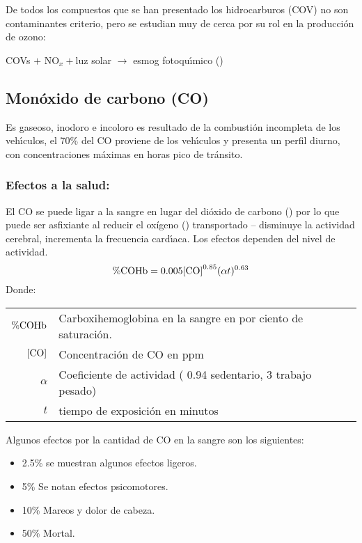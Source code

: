 De todos los compuestos que se han presentado los hidrocarburos (COV) no son contaminantes criterio, pero se estudian muy de cerca por su rol en la producción de ozono:

\begin{center}
COVs $+$ NO$_x +$luz solar $\longrightarrow$ esmog fotoqu\'{\i}mico () 
\end{center}

\subsection{Mon\'oxido de carbono (CO)}
Es gaseoso, inodoro e incoloro es resultado de la combusti\'on incompleta de los veh\'{\i}culos, el 70\% del CO proviene de los veh\'{\i}culos y presenta un perfil diurno, con concentraciones m\'aximas en horas pico de tr\'ansito.

\subsubsection{Efectos a la salud:}
El CO se puede ligar a la sangre en lugar del dióxido de carbono () por lo que puede ser asfixiante al reducir el oxígeno () transportado -- disminuye la actividad cerebral, incrementa la frecuencia card\'{\i}aca. Los efectos dependen del nivel de actividad.
\begin{equation}
\%\ce{COHb}  = 0.005[\ce{CO]}^{0.85}(\alpha t)^{0.63}
\end{equation}
Donde:

\begin{tabular}{r @{---}l}
$\%\ce{COHb} $ & Carboxihemoglobina en la sangre en por ciento de sa\-tu\-ra\-ci\'on.\\
$[\ce{CO}]$ &Concentraci\'on de CO en ppm\\
$\alpha$ & Coeficiente de actividad ( 0.94 sedentario, 3 trabajo pesado)\\
$t$ & tiempo de exposici\'on en minutos\\
\end{tabular}

Algunos efectos por la cantidad de CO en la sangre son los siguientes:
\begin{itemize}
\item 2.5\% se muestran algunos efectos ligeros.
\item 5\% Se notan efectos psicomotores.
\item 10\% Mareos y dolor de cabeza.
\item 50\% Mortal.
\end{itemize}

